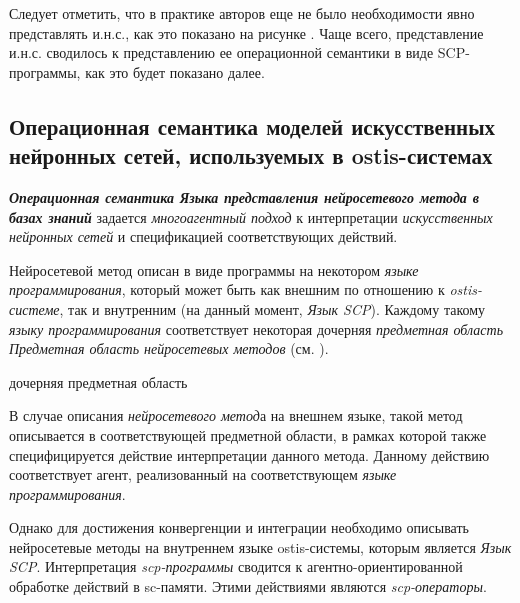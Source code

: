 Следует отметить, что в практике авторов еще не было необходимости явно представлять и.н.с., как это показано на рисунке \textit{}. Чаще всего, представление и.н.с. сводилось к представлению ее операционной семантики в виде SCP-программы, как это будет показано далее.

\subsection{Операционная семантика моделей искусственных нейронных сетей, используемых в ostis-системах}

\textbf{\textit{Операционная семантика Языка представления нейросетевого метода в базах знаний}} задается \textit{многоагентный подход} к интерпретации \textit{искусственных нейронных сетей} и спецификацией соответствующих действий.

Нейросетевой метод описан в виде программы на некотором \textit{языке программирования}, который может быть как внешним по отношению к \textit{ostis-системе}, так и внутренним (на данный момент, \textit{Язык SCP}). Каждому такому \textit{языку программирования} соответствует некоторая дочерняя \textit{предметная область} \textit{Предметная область нейросетевых методов} (см. ).

\begin{SCn}
	\begin{scnrelfromset}{дочерняя предметная область}
	\end{scnrelfromset}
\end{SCn}

В случае описания \textit{нейросетевого метод}а на внешнем языке, такой метод описывается в соответствующей предметной области, в рамках которой также специфицируется действие интерпретации данного метода. Данному действию соответствует агент, реализованный на соответствующем \textit{языке программирования}.

Однако для достижения конвергенции и интеграции необходимо описывать нейросетевые методы на внутреннем языке ostis-системы, которым является \textit{Язык SCP}.
Интерпретация \textit{scp-программы} сводится к агентно-ориентированной обработке действий в sc-памяти. Этими действиями являются \textit{scp-операторы}.

